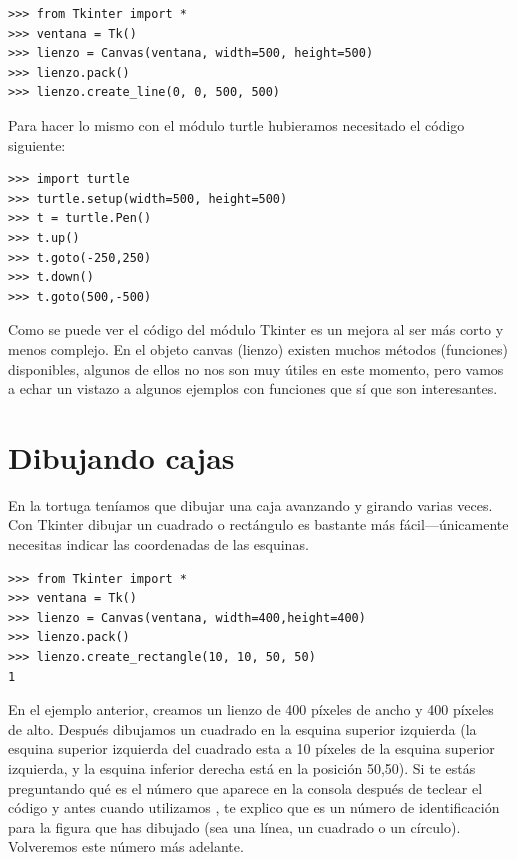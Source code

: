 \begin{listing}
\begin{verbatim}
>>> from Tkinter import *
>>> ventana = Tk()
>>> lienzo = Canvas(ventana, width=500, height=500)
>>> lienzo.pack()
>>> lienzo.create_line(0, 0, 500, 500)
\end{verbatim}
\end{listing}

\noindent
Para hacer lo mismo con el módulo turtle hubieramos necesitado el código siguiente:

\begin{listing}
\begin{verbatim}
>>> import turtle
>>> turtle.setup(width=500, height=500)
>>> t = turtle.Pen()
>>> t.up()
>>> t.goto(-250,250)
>>> t.down()
>>> t.goto(500,-500)
\end{verbatim}
\end{listing}

Como se puede ver el código del módulo Tkinter es un mejora al ser más corto y menos complejo. En el objeto canvas (lienzo) existen muchos métodos (funciones) disponibles, algunos de ellos no nos son muy útiles en este momento, pero vamos a echar un vistazo a algunos ejemplos con funciones que sí que son interesantes.

\section{Dibujando cajas}

En la tortuga teníamos que dibujar una caja avanzando y girando varias veces. Con Tkinter dibujar un cuadrado o rectángulo es bastante más fácil---únicamente necesitas indicar las coordenadas de las esquinas.

\begin{listingignore}
\begin{verbatim}
>>> from Tkinter import *
>>> ventana = Tk()
>>> lienzo = Canvas(ventana, width=400,height=400)
>>> lienzo.pack()
>>> lienzo.create_rectangle(10, 10, 50, 50)
1
\end{verbatim}
\end{listingignore}

En el ejemplo anterior, creamos un lienzo de 400 píxeles de ancho y 400 píxeles de alto. Después dibujamos un cuadrado en la esquina superior izquierda (la esquina superior izquierda del cuadrado esta a 10 píxeles de la esquina superior izquierda, y la esquina inferior derecha está en la posición 50,50).  Si te estás preguntando qué es el número que aparece en la consola después de teclear el código  y antes cuando utilizamos , te explico que es un número de identificación para la figura que has dibujado (sea una línea, un cuadrado o un círculo). Volveremos este número más adelante.

